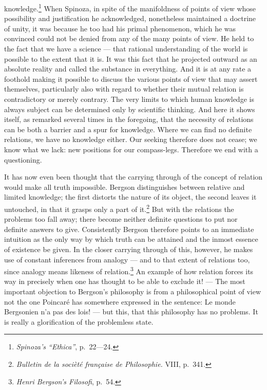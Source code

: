 \documentclass[12pt]{article}
\newcommand{\opage}[1]{\marginnote{\footnotesize\textit{[#1]}}}
\begin{document}
knowledge.\footnote{\textit{Spinoza's ``Ethica''}, p.~22---24.} When
Spinoza, in spite of the manifoldness of points of view whose possibility
and justification he acknowledged, nonetheless maintained a doctrine of
unity, it was because he too had his primal phenomenon, which he was
convinced could not be denied from any of the many points of view. He held
to the fact that we have a science --- that rational understanding of the
world is possible to the extent that it is. It was this fact that he
projected outward as an absolute reality and called the substance in
everything. And it is at any rate a foothold making it possible to discuss
the various points of view that may assert themselves, particularly also
with regard to whether their mutual \opage{101}relation is contradictory or merely
contrary. The very limits to which human knowledge is always subject can be
determined only by scientific thinking. And here it shows itself, as
remarked several times in the foregoing, that the necessity of relations can
be both a barrier and a spur for knowledge. Where we can find no definite
relations, we have no knowledge either. Our seeking therefore does not
cease; we know what we lack: new positions for our compass-legs. Therefore
we end with a questioning.

It has now even been thought that the carrying through of the concept of
relation would make all truth impossible. Bergson distinguishes between
relative and limited knowledge; the first distorts the nature of its object,
the second leaves it untouched, in that it grasps only a part of
it.\footnote{\textit{Bulletin de la socièté française de Philosophie.} VIII,
p.~341.}
But with the relations the problems too fall away; there become neither
definite questions to put nor definite answers to give. Consistently
Bergson therefore points to an immediate intuition as the only way by which
truth can be attained and the inmost essence of existence be given. In the
closer carrying through of this, however, he makes use of constant
inferences from analogy --- and to that extent of relations too, since
analogy means likeness of relation.\footnote{\textit{Henri Bergson's
Filosofi}, p.~54.} An example of how relation forces its way in precisely
when one has thought to be able to exclude it! --- The most important
objection to Bergson's philosophy is from a philosophical point of view not
the one Poincaré has somewhere expressed in the sentence: Le monde
Bergsonien n'a pas des lois! --- but this, that this philosophy has no
problems. It is really a glorification of the problemless state.
\end{document}
